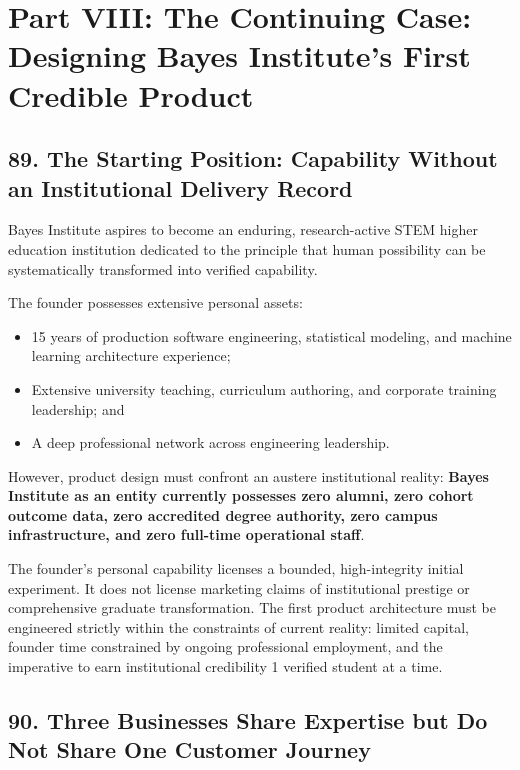 \section*{Part VIII: The Continuing Case: Designing Bayes Institute's First Credible Product}

\subsection*{89. The Starting Position: Capability Without an Institutional Delivery Record}

Bayes Institute aspires to become an enduring, research-active STEM higher education institution dedicated to the principle that human possibility can be systematically transformed into verified capability.

The founder possesses extensive personal assets:
\begin{itemize}
    \item 15 years of production software engineering, statistical modeling, and machine learning architecture experience;
    \item Extensive university teaching, curriculum authoring, and corporate training leadership; and
    \item A deep professional network across engineering leadership.
\end{itemize}

However, product design must confront an austere institutional reality: \textbf{Bayes Institute as an entity currently possesses zero alumni, zero cohort outcome data, zero accredited degree authority, zero campus infrastructure, and zero full-time operational staff}.

The founder's personal capability licenses a bounded, high-integrity initial experiment. It does not license marketing claims of institutional prestige or comprehensive graduate transformation. The first product architecture must be engineered strictly within the constraints of current reality: limited capital, founder time constrained by ongoing professional employment, and the imperative to earn institutional credibility 1 verified student at a time.

\subsection*{90. Three Businesses Share Expertise but Do Not Share One Customer Journey}

